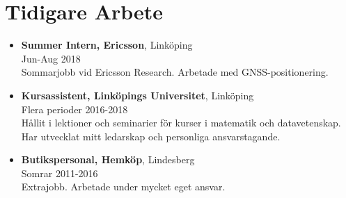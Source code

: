 \documentclass[12pt]{article}
\newcommand{\text}[2]{#2}
\newcommand{\text}[2]{#1}
\begin{document}
\section*{\text{Previous Work}{Tidigare Arbete}}
\begin{itemize}
    \item \textbf{Summer Intern, Ericsson}, Linköping\\
        Jun-Aug 2018\\
        \text{
            Summer internship at Ericsson Research. Worked with GNSS positioning.
        }{
            Sommarjobb vid Ericsson Research. Arbetade med GNSS-positionering.
        }

    \item \textbf{\text{Teaching Assistant, Linköping University}{Kursassistent, Linköpings Universitet}}, Linköping\\
        \text{Multiple periods}{Flera perioder} 2016-2018\\
        \text{
            In charge of lessons and seminars for courses in mathematics and computer science. Developed my leadership skills and personal responsibility.
        }{
            Hållit i lektioner och seminarier för kurser i matematik och datavetenskap. Har utvecklat mitt ledarskap och personliga ansvarstagande.
        }

    \item \textbf{\text{Store Clerk}{Butikspersonal}, Hemköp}, Lindesberg\\
        \text{Summers}{Somrar} 2011-2016\\
        \text{
            Extra job. Worked under a lot of individual responsibility.
        }{
            Extrajobb. Arbetade under mycket eget ansvar.
        }

\end{itemize}
\end{document}
